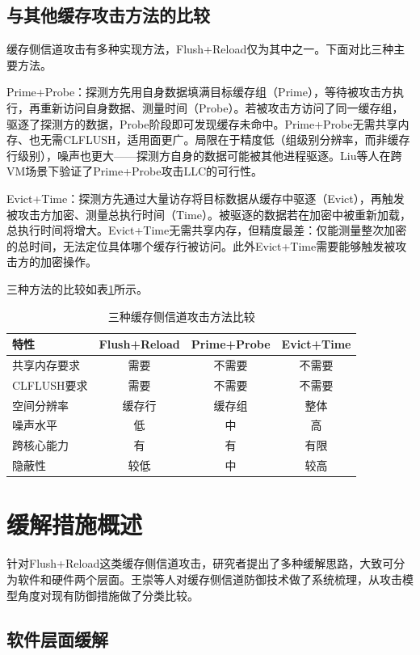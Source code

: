 \subsection{与其他缓存攻击方法的比较}

缓存侧信道攻击有多种实现方法，Flush+Reload仅为其中之一。下面对比三种主要方法。

Prime+Probe：探测方先用自身数据填满目标缓存组（Prime），等待被攻击方执行，再重新访问自身数据、测量时间（Probe）。若被攻击方访问了同一缓存组，驱逐了探测方的数据，Probe阶段即可发现缓存未命中。Prime+Probe无需共享内存、也无需CLFLUSH，适用面更广。局限在于精度低（组级别分辨率，而非缓存行级别），噪声也更大——探测方自身的数据可能被其他进程驱逐。Liu等人在跨VM场景下验证了Prime+Probe攻击LLC的可行性。

Evict+Time：探测方先通过大量访存将目标数据从缓存中驱逐（Evict），再触发被攻击方加密、测量总执行时间（Time）。被驱逐的数据若在加密中被重新加载，总执行时间将增大。Evict+Time无需共享内存，但精度最差：仅能测量整次加密的总时间，无法定位具体哪个缓存行被访问。此外Evict+Time需要能够触发被攻击方的加密操作。

三种方法的比较如表\ref{tab:attack_comparison}所示。

\begin{table}[htbp]
\centering
\caption{三种缓存侧信道攻击方法比较}
\label{tab:attack_comparison}
\begin{tabular}{lccc}
\hline
特性 & Flush+Reload & Prime+Probe & Evict+Time \\
\hline
共享内存要求 & 需要 & 不需要 & 不需要 \\
CLFLUSH要求 & 需要 & 不需要 & 不需要 \\
空间分辨率 & 缓存行 & 缓存组 & 整体 \\
噪声水平 & 低 & 中 & 高 \\
跨核心能力 & 有 & 有 & 有限 \\
隐蔽性 & 较低 & 中 & 较高 \\
\hline
\end{tabular}
\end{table}

\section{缓解措施概述}

针对Flush+Reload这类缓存侧信道攻击，研究者提出了多种缓解思路，大致可分为软件和硬件两个层面。王崇等人对缓存侧信道防御技术做了系统梳理，从攻击模型角度对现有防御措施做了分类比较。

\subsection{软件层面缓解}

